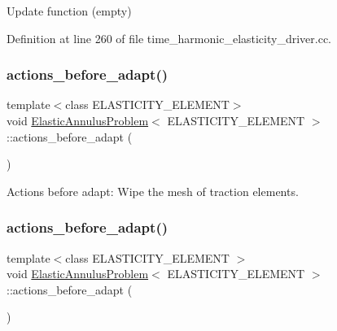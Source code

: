 Update function (empty) 



Definition at line 260 of file time\+\_\+harmonic\+\_\+elasticity\+\_\+driver.\+cc.

\mbox{\label{classElasticAnnulusProblem_abc8f38dd49a37b06212c168588301900}} 
\subsubsection{\texorpdfstring{actions\+\_\+before\+\_\+adapt()}{actions\_before\_adapt()}\hspace{0.1cm}{\footnotesize\ttfamily [1/2]}}
{\footnotesize\ttfamily template$<$class E\+L\+A\+S\+T\+I\+C\+I\+T\+Y\+\_\+\+E\+L\+E\+M\+E\+NT$>$ \\
void \hyperlink{classElasticAnnulusProblem}{Elastic\+Annulus\+Problem}$<$ E\+L\+A\+S\+T\+I\+C\+I\+T\+Y\+\_\+\+E\+L\+E\+M\+E\+NT $>$\+::actions\+\_\+before\+\_\+adapt (\begin{DoxyParamCaption}{ }\end{DoxyParamCaption})}



Actions before adapt\+: Wipe the mesh of traction elements. 

\mbox{\label{classElasticAnnulusProblem_abc8f38dd49a37b06212c168588301900}} 
\subsubsection{\texorpdfstring{actions\+\_\+before\+\_\+adapt()}{actions\_before\_adapt()}\hspace{0.1cm}{\footnotesize\ttfamily [2/2]}}
{\footnotesize\ttfamily template$<$class E\+L\+A\+S\+T\+I\+C\+I\+T\+Y\+\_\+\+E\+L\+E\+M\+E\+NT $>$ \\
void \hyperlink{classElasticAnnulusProblem}{Elastic\+Annulus\+Problem}$<$ E\+L\+A\+S\+T\+I\+C\+I\+T\+Y\+\_\+\+E\+L\+E\+M\+E\+NT $>$\+::actions\+\_\+before\+\_\+adapt (\begin{DoxyParamCaption}{ }\end{DoxyParamCaption})}



